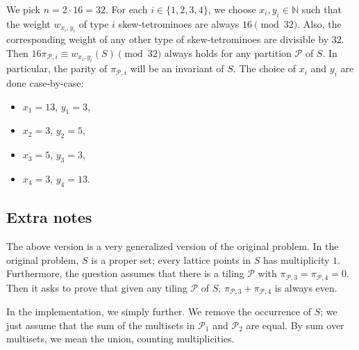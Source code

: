 \documentclass{article}
\newcommand{\N}{\mathbb{N}}
\newcommand{\cP}{\mathcal{P}}
\begin{document}
We pick $n = 2 \cdot 16 = 32$.
For each $i \in \{1, 2, 3, 4\}$, we choose $x_i, y_i \in \N$ such that the weight $w_{x_i, y_i}$ of type $i$ skew-tetrominoes are always $16 \pmod{32}$.
Also, the corresponding weight of any other type of skew-tetrominoes are divisible by $32$.
Then $16 \pi_{\cP, i} \equiv w_{x_i, y_i}(S) \pmod{32}$ always holds for any partition $\cP$ of $S$.
In particular, the parity of $\pi_{\cP, i}$ will be an invariant of $S$.
The choice of $x_i$ and $y_i$ are done case-by-case:
\begin{itemize}
    \item   $x_1 = 13$, $y_1 = 3$,
    \item   $x_2 = 3$, $y_2 = 5$,
    \item   $x_3 = 5$, $y_3 = 3$,
    \item   $x_4 = 3$, $y_4 = 13$.
\end{itemize}



\subsection*{Extra notes}

The above version is a very generalized version of the original problem.
In the original problem, $S$ is a proper set; every lattice points in $S$ has multiplicity $1$.
Furthermore, the question assumes that there is a tiling $\cP$ with $\pi_{\cP, 3} = \pi_{\cP, 4} = 0$.
Then it asks to prove that given any tiling $\cP$ of $S$, $\pi_{\cP, 3} + \pi_{\cP, 4}$ is always even.

In the implementation, we simply further.
We remove the occurrence of $S$; we just assume that the sum of the multisets in $\cP_1$ and $\cP_2$ are equal.
By sum over multisets, we mean the union, counting multiplicities.
\end{document}
